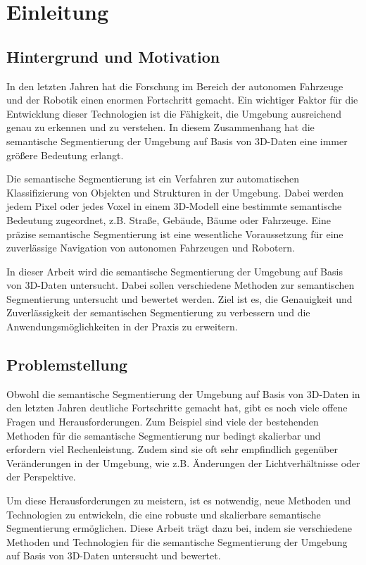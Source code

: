 \chapter{Einleitung}
\section{Hintergrund und Motivation}

In den letzten Jahren hat die Forschung im Bereich der autonomen Fahrzeuge und
der Robotik einen enormen Fortschritt gemacht. Ein wichtiger Faktor für die
Entwicklung dieser Technologien ist die Fähigkeit, die Umgebung ausreichend
genau zu erkennen und zu verstehen. In diesem Zusammenhang hat die semantische
Segmentierung der Umgebung auf Basis von 3D-Daten eine immer größere Bedeutung
erlangt.

Die semantische Segmentierung ist ein Verfahren zur automatischen
Klassifizierung von Objekten und Strukturen in der Umgebung. Dabei werden jedem
Pixel oder jedes Voxel in einem 3D-Modell eine bestimmte semantische Bedeutung
zugeordnet, z.B. Straße, Gebäude, Bäume oder Fahrzeuge. Eine präzise
semantische Segmentierung ist eine wesentliche Voraussetzung für eine
zuverlässige Navigation von autonomen Fahrzeugen und Robotern.

In dieser Arbeit wird die semantische Segmentierung der Umgebung auf Basis von
3D-Daten untersucht. Dabei sollen verschiedene Methoden zur semantischen
Segmentierung untersucht und bewertet werden. Ziel ist es, die Genauigkeit und
Zuverlässigkeit der semantischen Segmentierung zu verbessern und die
Anwendungsmöglichkeiten in der Praxis zu erweitern.

\section{Problemstellung}

Obwohl die semantische Segmentierung der Umgebung auf Basis von 3D-Daten in den
letzten Jahren deutliche Fortschritte gemacht hat, gibt es noch viele offene
Fragen und Herausforderungen. Zum Beispiel sind viele der bestehenden Methoden
für die semantische Segmentierung nur bedingt skalierbar und erfordern viel
Rechenleistung. Zudem sind sie oft sehr empfindlich gegenüber Veränderungen in
der Umgebung, wie z.B. Änderungen der Lichtverhältnisse oder der Perspektive.

Um diese Herausforderungen zu meistern, ist es notwendig, neue Methoden und
Technologien zu entwickeln, die eine robuste und skalierbare semantische
Segmentierung ermöglichen. Diese Arbeit trägt dazu bei, indem sie verschiedene
Methoden und Technologien für die semantische Segmentierung der Umgebung auf
Basis von 3D-Daten untersucht und bewertet.

